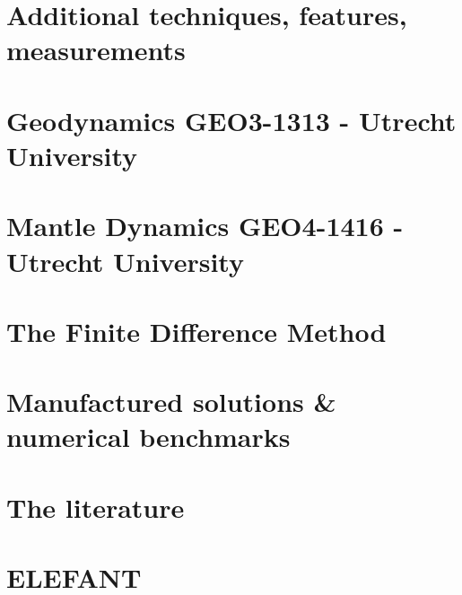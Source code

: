 \documentclass[a4paper]{article}
\numberwithin{equation}{section}
\begin{document}
\section{Additional techniques, features, measurements} %


\newpage
\section{Geodynamics GEO3-1313 - Utrecht University} %


\newpage
\section{Mantle Dynamics GEO4-1416 - Utrecht University} %


\newpage
\section{The Finite Difference Method} %


\newpage
\section{Manufactured solutions \& numerical benchmarks} %


\newpage
\section{The literature} %
 \label{app:topics}

\newpage
\section{ELEFANT} %
 \label{chapt:elefant}
\end{document}
